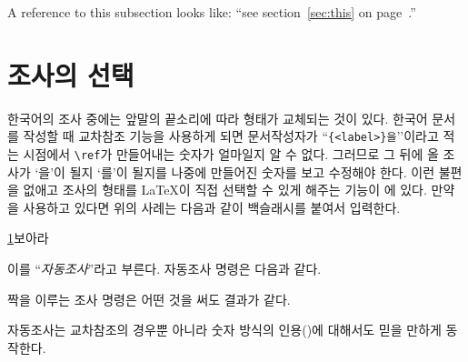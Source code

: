 \begin{example}
A reference to this subsection
\label{sec:this} looks like:
``see section~\ref{sec:this} on
page~\pageref{sec:this}.''
\end{example}

\section{조사의 선택}\label{autojosa}
한국어의 조사 중에는 앞말의 끝소리에 따라 형태가 교체되는 것이 있다.
한국어 문서를 작성할 때 교차참조 기능을 사용하게 되면 문서작성자가 ``\texttt{\{<label>\}을}’’이라고 
적는 시점에서 \verb|\ref|가 만들어내는 숫자가 얼마일지 알 수 없다. 그러므로
그 뒤에 올 조사가 `을'이 될지 `를'이 될지를 나중에 만들어진 숫자를 보고 수정해야 한다.
이런 불편을 없애고 조사의 형태를 \LaTeX 이 직접 선택할 수 있게 해주는 기능이 \koTeX 에 있다.
만약 \koTeX 을 사용하고 있다면 위의 사례는 다음과 같이 백슬래시를 붙여서 입력한다.
\begin{example}
  \ref{autojosa}\을 보아라
\end{example}
\noindent 이를 ``\emph{자동조사}''라고 부른다. 자동조사 명령은 다음과 같다.
\begin{lscommand}
   
   
   
   
   
   
\end{lscommand}
\noindent 짝을 이루는 조사 명령은 어떤 것을 써도 결과가 같다.

자동조사는 교차참조의 경우뿐 아니라 숫자 방식의 인용()에 대해서도 믿을 만하게 동작한다.

